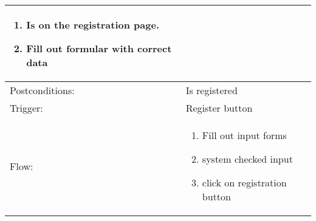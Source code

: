 \begin{longtable}{| p{3.5cm} | p{9cm} |}
\begin{enumerate}
\item Is on the registration page.
\item Fill out formular with correct data 
\end{enumerate}\\
\hline
Postconditions: & Is registered \\
\hline
Trigger: & Register button \\
\hline
Flow: &\mbox{}\par\vspace{-\baselineskip}
\begin{enumerate}
\item Fill out input forms
\item system checked input
\item click on registration button
\end{enumerate}\\
\hline
\end{longtable}

